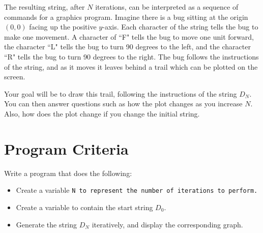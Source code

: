 \documentclass{article}
\def\prog#1{
\vspace{.1in}\begin{mdframed} \begin{center} \textbf{Programming Reminders} \end{center}#1 \end{mdframed} }
\begin{document}
	The resulting string, after $N$ iterations, can be interpreted as a sequence of commands for a graphics program.  Imagine there is a bug sitting at the origin $(0,0)$ facing up the positive $y$-axis.  Each character of the string tells the bug to make one movement.  A character of ``F" tells the bug to move one unit forward, the character ``L" tells the bug to turn 90 degrees to the left, and the character ``R" tells the bug to turn 90 degrees to the right.  The bug follows the instructions of the string, and as it moves it leaves behind a trail which can be plotted on the screen.  
	
	Your goal will be to draw this trail, following the instructions of the string $D_N$.  You can then answer questions such as how the plot changes as you increase $N$.  Also, how does the plot change if you change the initial string.


	
	
 
 	
 	
 	
 	
 	
 	
 	

	
	
	
	
	
	
	
	




\section*{Program Criteria}
	Write a program that does the following:
	\begin{itemize}
		\item Create a variable \tt{N} to represent the number of iterations to perform.
		\item Create a variable to contain the start string $D_0$.
		\item Generate  the string $D_N$ iteratively, and display the corresponding graph.
	\end{itemize}
\end{document}
